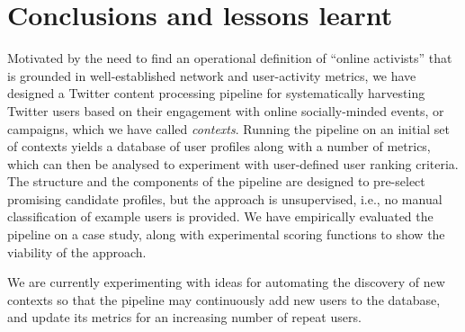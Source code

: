 \vspace{-10pt}
\section{Conclusions and lessons learnt}
\vspace{-10pt}


Motivated by the need to find an operational definition of ``online activists'' that is grounded in well-established network and user-activity metrics, we have designed a Twitter content processing pipeline for systematically harvesting Twitter users based on their engagement with online socially-minded events, or campaigns, which we have called \textit{contexts}.
Running the pipeline on an initial set of contexts yields a database of user profiles along with a number of metrics, which can then be analysed to experiment with user-defined user ranking criteria. The structure and the components of the pipeline are designed to pre-select promising candidate profiles, but the approach is unsupervised, i.e., no manual classification of example users is provided.
We have empirically evaluated the pipeline on a case study, along with experimental scoring functions to show the viability of the approach. 


We are currently experimenting with ideas for automating the discovery of new contexts so that the pipeline may continuously add new users to the database, and update its metrics for an increasing number of  repeat users.